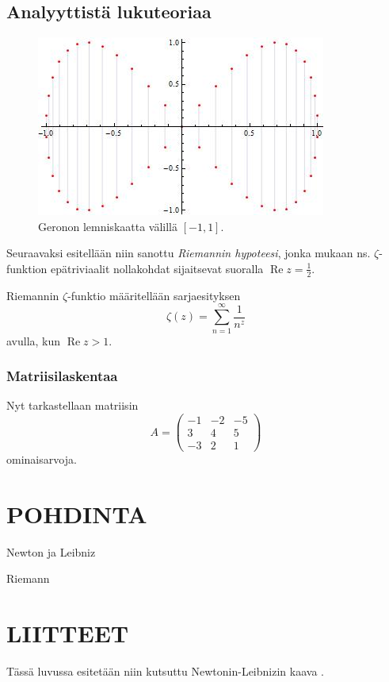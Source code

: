\subsection{Analyyttistä lukuteoriaa}

\begin{figure}[ht]
\begin{center}
\includegraphics[width=.45\textwidth]{siivet.jpg}
\end{center}
\label{kuvatus1}
\caption{Geronon lemniskaatta välillä $[-1,1]$.}
\end{figure}

Seuraavaksi esitellään niin sanottu {\em Riemannin hypoteesi}, jonka mukaan ns. $\zeta$-funktion epätriviaalit nollakohdat sijaitsevat suoralla $\operatorname{Re}z=\frac12$.
\begin{definition} Riemannin $\zeta$-funktio määritellään sarjaesityksen \cite{Riemann}
\[
\zeta(z)=\sum_{n=1}^{\infty}\frac{1}{n^z}
\]
avulla, kun $\operatorname{Re}z>1$.
\end{definition}

\subsubsection{Matriisilaskentaa}

Nyt tarkastellaan matriisin
\[
A=\left(\begin{array}{rrr} -1 & -2 & -5\\ 3& 4& 5\\ -3 & 2 & 1 \end{array}\right)
\]
ominaisarvoja.



\section{POHDINTA}
\lipsum[1]
\vspace{0.7cm}
\lipsum[1]

 
\begin{thebibliography}{99}

 Newton ja Leibniz

 Riemann

\end{thebibliography}

\section{LIITTEET}

Tässä luvussa esitetään niin kutsuttu Newtonin-Leibnizin kaava \cite{NewtLeib}.


